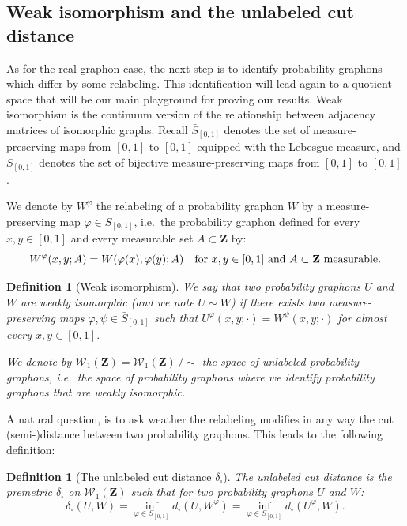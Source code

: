 \documentclass[12pt,twoside,a4paper]{article}
\newtheorem{definition}[theorem]{Definition}
\newcommand{\Space}{\mathbf{Z}}
\newcommand{\Graphon}{\mathcal{W}_1}
\newcommand{\UGraphon}{\widetilde{\mathcal{W}}_1}
\newcommand{\InvRelabel}{S_{[0,1]}}
\newcommand{\Relabel}{\bar{S}_{[0,1]}}
\newcommand{\dd}{\delta_{\square}}
\begin{document}
\subsection{Weak isomorphism and the unlabeled  cut distance}
	\label{subsection_unlabeled_cut_distance}
As for the real-graphon case, the next step is to identify probability graphons which differ by some relabeling. This identification will lead again to a quotient space that will be our main playground for proving our results.
Weak isomorphism is the continuum version of the relationship
between adjacency matrices of isomorphic graphs.
Recall $\Relabel$ denotes the set of measure-preserving maps from $[0, 1]$ to $[0, 1]$ equipped with the Lebesgue measure, and $\InvRelabel$ denotes the set of bijective measure-preserving maps from $[0, 1]$ to $[0, 1]$.

We denote by $W^\varphi$ the relabeling of a probability graphon $W$ by a measure-preserving map $\varphi\in \Relabel$, i.e.\
the probability graphon defined for every $x,y\in [0,1]$ and every measurable set $A\subset \Space$ by:
\[
  W^\varphi(x,y;A) = W(\varphi(x),\varphi(y);A)
  \quad \text{for $x,y\in [0,1]$ and $ A\subset \Space$ measurable}.
\]

\begin{definition}[Weak isomorphism]\label{def_weak_isomorphism}
We say that two probability graphons $U$ and $W$ are \emph{weakly isomorphic}
(and we note $U\sim W$) if there exists two measure-preserving maps $\varphi, \psi\in\Relabel$
such that $U^\varphi(x,y; \cdot) = W^\psi(x,y;\cdot)$ for almost every $x,y\in [0,1].$

We denote by $\UGraphon(\Space)=\Graphon (\Space)\,/ \sim$ the space of unlabeled probability graphons, i.e.\
the space of probability graphons where we identify probability graphons that are weakly isomorphic. 
\end{definition}

A natural question, is to ask weather the relabeling modifies in any way the cut (semi-)distance between two probability graphons. This leads to the following definition:
\begin{definition}[The unlabeled cut distance $\delta_{\square}$]\label{def:ddcut}
 The \emph{unlabeled cut distance} is the premetric $\dd$ on $\Graphon(\Space)$ such that for two probability graphons $U$ and $W$:
\begin{equation}\label{def_ddcut}
\dd(U,W) = \inf_{\varphi\in\InvRelabel} d_{\square}(U,W^\varphi)	
= \inf_{\varphi\in\InvRelabel} d_{\square}\left(U^{\varphi},W\right)		 .\end{equation}
\end{definition}
\end{document}
